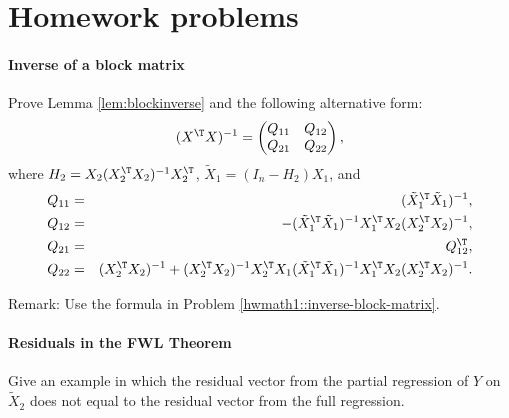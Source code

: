  


\section{Homework problems}

\paragraph{Inverse of a block matrix}\label{hw6::inverse-block-gram}

Prove Lemma \ref{lem:blockinverse} and the following alternative form: 
$$
(X^{\T} X)^{-1} = \begin{pmatrix}
Q_{11} & Q_{12} \\
Q_{21} & Q_{22}
\end{pmatrix},
$$
where $H_2 = X_2(X_2^{\T} X_2)^{-1} X_2 ^{\T} $, $\tilde{X}_1 = (I_n - H_2) X_1$, and
\begin{eqnarray*}
Q_{11} &=& (\tilde{X}_1^{\T} \tilde{X}_1)^{-1} ,\\
Q_{12} &=& - (\tilde{X}_1^{\T} \tilde{X}_1)^{-1} X_1^{\T} X_2 (X_2^{\T} X_2)^{-1} ,\\
Q_{21} &=& Q_{12}^{\T},\\
Q_{22} &=& (X_2^{\T} X_2)^{-1}  + (X_2^{\T} X_2)^{-1} X_2^{\T} X_1 (\tilde{X}_1^{\T} \tilde{X}_1)^{-1} X_1^{\T} X_2 (X_2^{\T} X_2)^{-1}.
\end{eqnarray*}

Remark: Use the formula in Problem \ref{hwmath1::inverse-block-matrix}. 


 

\paragraph{Residuals in the FWL Theorem}\label{hw06-fwl-residual}

Give an example in which the residual vector from the partial regression of $Y$ on $\tilde{X}_{2}$ does not equal to the residual vector from the full regression. 

 

%


